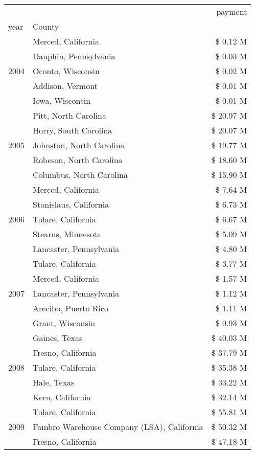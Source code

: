 \begin{tabular}{llr}
\toprule
 &  & payment \\
year & County &  \\
\midrule
\multirow[t]{5}{*}{2004} & Merced, California & \$ 0.12 M \\
 & Dauphin, Pennsylvania & \$ 0.03 M \\
 & Oconto, Wisconsin & \$ 0.02 M \\
 & Addison, Vermont & \$ 0.01 M \\
 & Iowa, Wisconsin & \$ 0.01 M \\
\cline{1-3}
\multirow[t]{5}{*}{2005} & Pitt, North Carolina & \$ 20.97 M \\
 & Horry, South Carolina & \$ 20.07 M \\
 & Johnston, North Carolina & \$ 19.77 M \\
 & Robeson, North Carolina & \$ 18.60 M \\
 & Columbus, North Carolina & \$ 15.90 M \\
\cline{1-3}
\multirow[t]{5}{*}{2006} & Merced, California & \$ 7.64 M \\
 & Stanislaus, California & \$ 6.73 M \\
 & Tulare, California & \$ 6.67 M \\
 & Stearns, Minnesota & \$ 5.09 M \\
 & Lancaster, Pennsylvania & \$ 4.80 M \\
\cline{1-3}
\multirow[t]{5}{*}{2007} & Tulare, California & \$ 3.77 M \\
 & Merced, California & \$ 1.57 M \\
 & Lancaster, Pennsylvania & \$ 1.12 M \\
 & Arecibo, Puerto Rico & \$ 1.11 M \\
 & Grant, Wisconsin & \$ 0.93 M \\
\cline{1-3}
\multirow[t]{5}{*}{2008} & Gaines, Texas & \$ 40.03 M \\
 & Fresno, California & \$ 37.79 M \\
 & Tulare, California & \$ 35.38 M \\
 & Hale, Texas & \$ 33.22 M \\
 & Kern, California & \$ 32.14 M \\
\cline{1-3}
\multirow[t]{5}{*}{2009} & Tulare, California & \$ 55.81 M \\
 & Fambro Warehouse Company (LSA), California & \$ 50.32 M \\
 & Fresno, California & \$ 47.18 M \\

\end{tabular}
